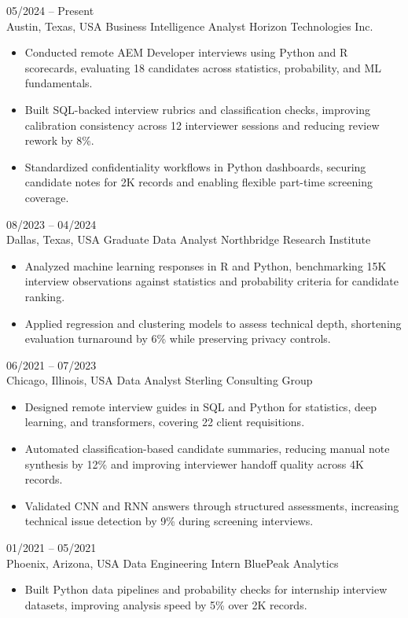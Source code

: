 \documentclass[10pt]{developercv}
\begin{document}
\begin{entrylist}

  \entry
  {05/2024 -- Present\\\footnotesize{Austin, Texas, USA}}
  {Business Intelligence Analyst}
  {Horizon Technologies Inc.}
  {
  \begin{itemize}[leftmargin=*]
        \item Conducted remote AEM Developer interviews using Python and R scorecards, evaluating 18 candidates across statistics, probability, and ML fundamentals.
    \item Built SQL-backed interview rubrics and classification checks, improving calibration consistency across 12 interviewer sessions and reducing review rework by 8\%.
    \item Standardized confidentiality workflows in Python dashboards, securing candidate notes for 2K records and enabling flexible part-time screening coverage.
  \end{itemize}
  }


  \entry
  {08/2023 -- 04/2024\\\footnotesize{Dallas, Texas, USA}}
  {Graduate Data Analyst}
  {Northbridge Research Institute}
  {
  \begin{itemize}[leftmargin=*]
        \item Analyzed machine learning responses in R and Python, benchmarking 15K interview observations against statistics and probability criteria for candidate ranking.
    \item Applied regression and clustering models to assess technical depth, shortening evaluation turnaround by 6\% while preserving privacy controls.
  \end{itemize}
  }


  \entry
  {06/2021 -- 07/2023\\\footnotesize{Chicago, Illinois, USA}}
  {Data Analyst}
  {Sterling Consulting Group}
  {
  \begin{itemize}[leftmargin=*]
        \item Designed remote interview guides in SQL and Python for statistics, deep learning, and transformers, covering 22 client requisitions.
    \item Automated classification-based candidate summaries, reducing manual note synthesis by 12\% and improving interviewer handoff quality across 4K records.
    \item Validated CNN and RNN answers through structured assessments, increasing technical issue detection by 9\% during screening interviews.
  \end{itemize}
  }


  \entry
  {01/2021 -- 05/2021\\\footnotesize{Phoenix, Arizona, USA}}
  {Data Engineering Intern}
  {BluePeak Analytics}
  {
  \begin{itemize}[leftmargin=*]
        \item Built Python data pipelines and probability checks for internship interview datasets, improving analysis speed by 5\% over 2K records.
  \end{itemize}
  }

\end{entrylist}
\end{document}
